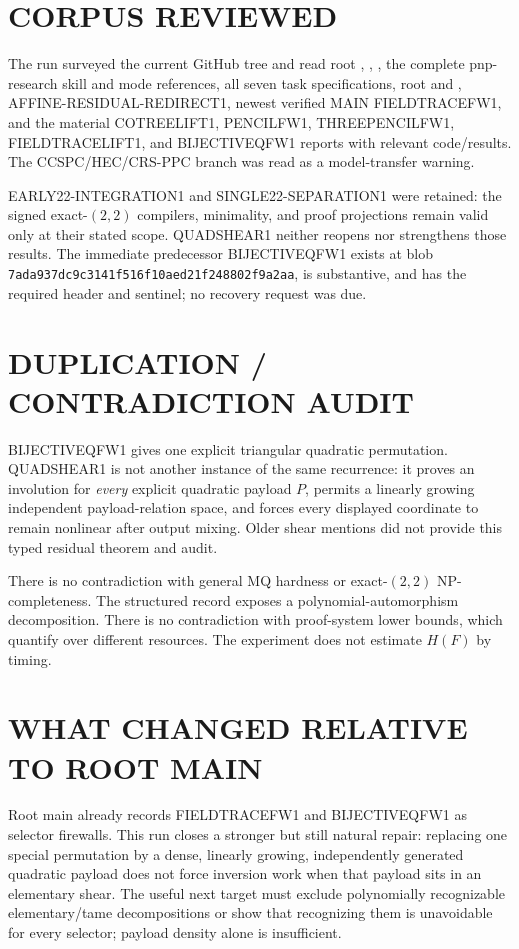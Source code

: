 \documentclass[11pt]{article}
\begin{document}
\section{CORPUS REVIEWED}
The run surveyed the current GitHub tree and read root ,
, , the complete pnp-research skill and mode
references, all seven task specifications, root  and
, AFFINE-RESIDUAL-REDIRECT1, newest verified MAIN
FIELDTRACEFW1, and the material COTREELIFT1, PENCILFW1, THREEPENCILFW1,
FIELDTRACELIFT1, and BIJECTIVEQFW1 reports with relevant code/results.
The CCSPC/HEC/CRS-PPC branch was read as a model-transfer warning.

EARLY22-INTEGRATION1 and SINGLE22-SEPARATION1 were retained: the signed
exact-$(2,2)$ compilers, minimality, and proof projections remain valid only
at their stated scope.  QUADSHEAR1 neither reopens nor strengthens those
results.  The immediate predecessor BIJECTIVEQFW1 exists at blob
\texttt{7ada937dc9c3141f516f10aed21f248802f9a2aa}, is substantive, and has the
required header and sentinel; no recovery request was due.

\section{DUPLICATION / CONTRADICTION AUDIT}
BIJECTIVEQFW1 gives one explicit triangular quadratic permutation.
QUADSHEAR1 is not another instance of the same recurrence: it proves an
involution for \emph{every} explicit quadratic payload $P$, permits a
linearly growing independent payload-relation space, and forces every
displayed coordinate to remain nonlinear after output mixing.  Older shear
mentions did not provide this typed residual theorem and audit.

There is no contradiction with general MQ hardness or exact-$(2,2)$
NP-completeness.  The structured record exposes a polynomial-automorphism
decomposition.  There is no contradiction with proof-system lower bounds,
which quantify over different resources.  The experiment does not estimate
$H(F)$ by timing.

\section{WHAT CHANGED RELATIVE TO ROOT MAIN}
Root main already records FIELDTRACEFW1 and BIJECTIVEQFW1 as selector
firewalls.  This run closes a stronger but still natural repair: replacing
one special permutation by a dense, linearly growing, independently generated
quadratic payload does not force inversion work when that payload sits in an
elementary shear.  The useful next target must exclude polynomially
recognizable elementary/tame decompositions or show that recognizing them is
unavoidable for every selector; payload density alone is insufficient.
\end{document}
